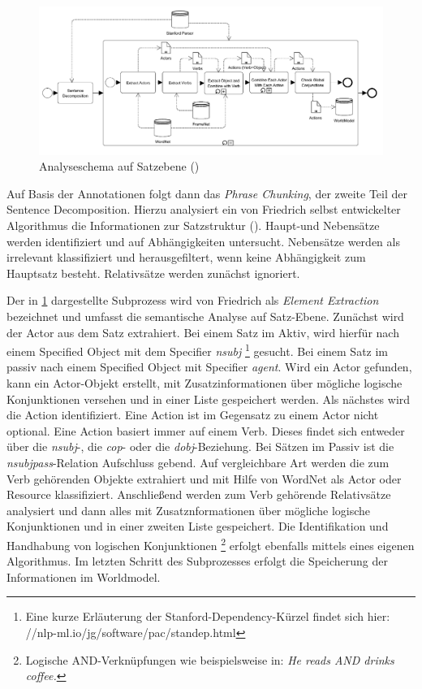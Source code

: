 \begin{figure}[H]
\begin{center}
\includegraphics[keepaspectratio=true, width=\textwidth]{pictures/SentenceLevel.png}
\caption{Analyseschema auf Satzebene (\cite[vgl.][5]{FRIEDRICH2})}
\label{fig:SLEVEL}
\end{center}\end{figure}
Auf Basis der Annotationen folgt dann das \textit{Phrase Chunking}, der zweite Teil der Sentence Decomposition. Hierzu analysiert ein von Friedrich selbst entwickelter Algorithmus die Informationen zur Satzstruktur (\cite[vgl.][49]{FRIEDRICH2}). Haupt-und Nebensätze werden identifiziert und  auf Abhängigkeiten untersucht. Nebensätze werden als irrelevant klassifiziert und herausgefiltert, wenn keine Abhängigkeit zum Hauptsatz besteht. Relativsätze werden zunächst ignoriert.
\par
Der in \ref{fig:SLEVEL} dargestellte Subprozess wird von Friedrich als \textit{Element Extraction} bezeichnet und umfasst die semantische Analyse auf Satz-Ebene. Zunächst wird der Actor aus dem Satz extrahiert. Bei einem Satz im Aktiv, wird hierfür nach einem Specified Object mit dem Specifier \textit{nsubj} \footnote{Eine kurze Erläuterung der Stanford-Dependency-Kürzel findet sich hier: //nlp-ml.io/jg/software/pac/standep.html} gesucht. Bei einem Satz im passiv nach einem Specified Object mit Specifier \textit{agent}. Wird ein Actor gefunden, kann ein Actor-Objekt erstellt, mit Zusatzinformationen über mögliche logische Konjunktionen versehen und in einer Liste gespeichert werden. Als nächstes wird die Action identifiziert.  Eine Action ist im Gegensatz zu einem Actor nicht optional. Eine Action basiert immer auf einem Verb. Dieses findet sich entweder über die \textit{nsubj}-, die \textit{cop}- oder die \textit{dobj}-Beziehung. Bei Sätzen im Passiv ist die \textit{nsubjpass}-Relation Aufschluss gebend. Auf vergleichbare Art werden die zum Verb gehörenden Objekte extrahiert und mit Hilfe von WordNet als Actor oder Resource klassifiziert. Anschließend werden zum Verb gehörende Relativsätze analysiert und dann alles mit Zusatznformationen über mögliche logische Konjunktionen und in einer zweiten Liste gespeichert. Die Identifikation und Handhabung von logischen Konjunktionen \footnote{Logische AND-Verknüpfungen wie beispielsweise in: \textit{He reads AND drinks coffee.}} erfolgt ebenfalls mittels eines eigenen Algorithmus. Im letzten Schritt des Subprozesses erfolgt die Speicherung der Informationen im Worldmodel.
